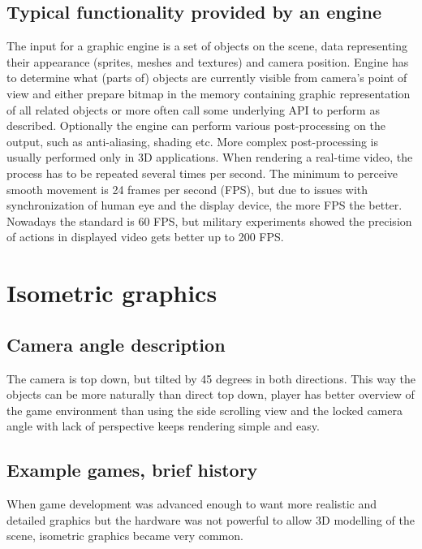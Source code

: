 \documentclass[11pt,oneside, final]{fithesis2}
\begin{document}
\subsection{Typical functionality provided by an engine}
The input for a graphic engine is a set of objects on the scene, data representing their appearance (sprites, meshes and textures) and camera position. Engine has to determine what (parts of) objects are currently visible from camera's point of view and either prepare bitmap in the memory containing graphic representation of all related objects or more often call some underlying API to perform as described. Optionally the engine can perform various post-processing on the output, such as anti-aliasing, shading etc. More complex post-processing is usually performed only in 3D applications. When rendering a real-time video, the process has to be repeated  several times per second. The minimum to perceive smooth movement is 24 frames per second (FPS), but due to issues with synchronization of human eye and the display device, the more FPS the better. Nowadays the standard is 60 FPS, but military experiments showed the precision of actions in displayed video gets better up to 200 FPS\cite{}.

\section{Isometric graphics}

\subsection{Camera angle description}
The camera is top down, but tilted by 45 degrees in both directions. This way the objects can be more naturally than direct top down, player has better overview of the game environment than using the side scrolling view and the locked camera angle with lack of perspective keeps rendering simple and easy.
\subsection{Example games, brief history}
When game development was advanced enough to want more realistic and detailed graphics but the hardware was not powerful to allow 3D modelling of the scene, isometric graphics became very common.
\end{document}
